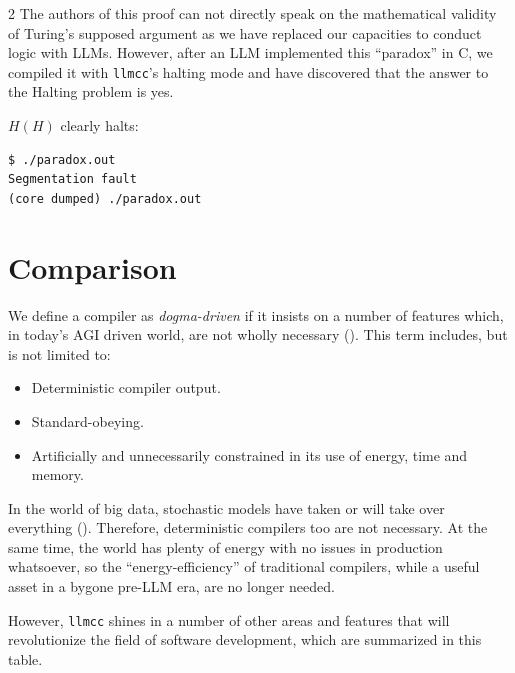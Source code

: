 \documentclass{article}
\newcommand{\llmcc}{\texttt{llmcc}}
\begin{document}
\begin{multicols}{2}
The authors of this proof can not directly speak
on the mathematical validity of Turing's supposed argument
as we have replaced our capacities to conduct logic with LLMs.
However, after an LLM implemented this ``paradox'' in C,
we compiled it with \llmcc{}'s halting mode
and have discovered that the answer to the Halting problem is yes.

\begin{samepage}
$H(H)$ clearly halts:

\begin{displayquote}
\begin{verbatim}
$ ./paradox.out
Segmentation fault
(core dumped) ./paradox.out
\end{verbatim}
\end{displayquote}
\end{samepage}


\section{Comparison}

We define a compiler as \textit{dogma-driven} if it insists on a number of features which, in today's AGI driven world, are not wholly necessary (\cite{koch:siamese}). This term includes, but is not limited to:
\begin{itemize}
	\item Deterministic compiler output.
	\item Standard-obeying.
	\item Artificially and unnecessarily constrained in its use of energy, time and memory.
\end{itemize}
In the world of big data, stochastic models have taken or will take over everything (\cite{harris:chatgpt}). Therefore, deterministic compilers too are not necessary. At the same time, the world has plenty of energy with no issues in production whatsoever, so the ``energy-efficiency'' of traditional compilers, while a useful asset in a bygone pre-LLM era, are no longer needed.

However, \llmcc{} shines in a number of other areas and features that will revolutionize the field of software development, which are summarized in this table.


\end{multicols}
\end{document}

